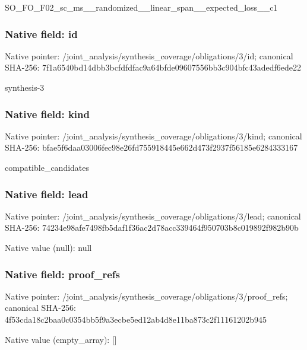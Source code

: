 \documentclass[10pt,a4paper]{article}
\begin{document}
\begingroup\raggedright\sloppy SO\_\allowbreak{}FO\_\allowbreak{}F02\_\allowbreak{}sc\_\allowbreak{}ms\_\allowbreak{}\_\allowbreak{}randomized\_\allowbreak{}\_\allowbreak{}linear\_\allowbreak{}span\_\allowbreak{}\_\allowbreak{}expected\_\allowbreak{}loss\_\allowbreak{}\_\allowbreak{}c1\par\endgroup

\subsubsection{Native field: id}
Native pointer: /joint\_\allowbreak{}analysis/synthesis\_\allowbreak{}coverage/obligations/3/id; canonical SHA-256: 7f1a6540bd14dbb3bcfdfdfac9a64bfde09607556bb3c904bfc43adedf6ede22

\begingroup\raggedright\sloppy synthesis-3\par\endgroup

\subsubsection{Native field: kind}
Native pointer: /joint\_\allowbreak{}analysis/synthesis\_\allowbreak{}coverage/obligations/3/kind; canonical SHA-256: bfae5f6daa03006fec98e26fd755918445e662d473f2937f56185e6284333167

\begingroup\raggedright\sloppy compatible\_\allowbreak{}candidates\par\endgroup

\subsubsection{Native field: lead}
Native pointer: /joint\_\allowbreak{}analysis/synthesis\_\allowbreak{}coverage/obligations/3/lead; canonical SHA-256: 74234e98afe7498fb5daf1f36ac2d78acc339464f950703b8c019892f982b90b

Native value (null): null

\subsubsection{Native field: proof\_\allowbreak{}refs}
Native pointer: /joint\_\allowbreak{}analysis/synthesis\_\allowbreak{}coverage/obligations/3/proof\_\allowbreak{}refs; canonical SHA-256: 4f53cda18c2baa0c0354bb5f9a3ecbe5ed12ab4d8e11ba873c2f11161202b945

Native value (empty\_\allowbreak{}array): []
\end{document}
